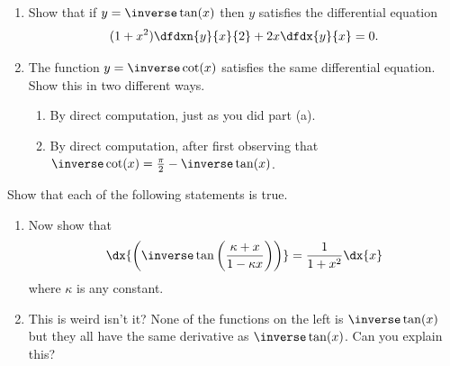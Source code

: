 \begin{embeddedproblem-enumerate}
  \begin{enumerate}[label={\bf{}(\alph*)}]
  \item Show that if $y=\inverse\tan(x)$ then $y$ satisfies the
    differential equation
    $$
    (1+x^2)\dfdxn{y}{x}{2}+2x\dfdx{y}{x}=0.
    $$
  \item The function   $y=\inverse\cot(x)$ satisfies the same differential
    equation. Show this in two different ways.
    \begin{enumerate}[label={\bf{}(\roman*)}]{}
    \item By direct computation, just as you did part (a).
    \item By direct computation, after first observing that $\inverse\cot(x)=\frac\pi2-\inverse\tan(x)$.
    \end{enumerate}
  \end{enumerate}{}
\end{embeddedproblem-enumerate}


\begin{embeddedproblem}
  Show that each of the following statements is true.
  \begin{enumerate}[label={\bf{}(\alph*)}]
  \item Now show that
    $$\dx{\left(\inverse\tan\left(\dfrac{\kappa+x}{1-\kappa x}\right)\right)}
    = \dfrac{1}{1+x^2}\dx{x}$$ where $\kappa$ is any constant.
  \item This is weird isn't it? None of the functions on the left is
    $\inverse\tan(x)$  but they all have the same derivative as $\inverse\tan(x)$. Can you
    explain this?\\
  \end{enumerate}
\end{embeddedproblem}



